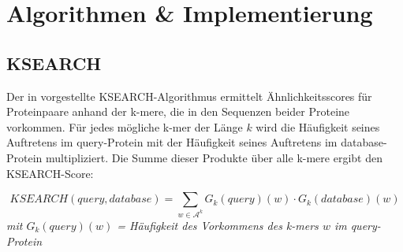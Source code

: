 \documentclass{article}
\begin{document}
\section{Algorithmen \& Implementierung}

\subsection{KSEARCH}
\label{ksearch}

Der in \cite{Holm} vorgestellte KSEARCH-Algorithmus ermittelt Ähnlichkeitsscores für Proteinpaare anhand der k-mere, die in den Sequenzen beider Proteine vorkommen. Für jedes mögliche k-mer der Länge $k$ wird die Häufigkeit seines Auftretens im query-Protein mit der Häufigkeit seines Auftretens im database-Protein multipliziert. Die Summe dieser Produkte über alle k-mere ergibt den KSEARCH-Score:

\begin{equation}
KSEARCH(query,database) = \sum_{w \in \mathcal A^k} G_k(query)(w) \cdot G_k(database)(w)
\end{equation}  
\textit{mit $G_k(query)(w)$ = Häufigkeit des Vorkommens des k-mers $w$ im query-Protein}\\ \\
\end{document}
